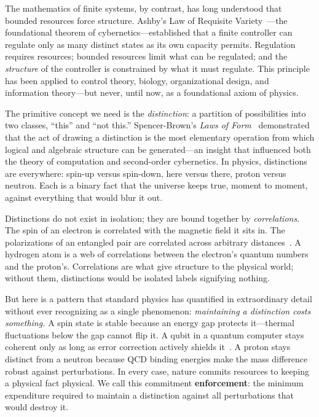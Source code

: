 \documentclass[11pt]{article}
\begin{document}
The mathematics of finite systems, by contrast, has long understood that bounded resources force structure.  Ashby's Law of Requisite Variety~\cite{Ashby1956}---the foundational theorem of cybernetics---established that a finite controller can regulate only as many distinct states as its own capacity permits.  Regulation requires resources; bounded resources limit what can be regulated; and the \emph{structure} of the controller is constrained by what it must regulate.  This principle has been applied to control theory, biology, organizational design, and information theory---but never, until now, as a foundational axiom of physics.

The primitive concept we need is the \emph{distinction}: a partition of possibilities into two classes, ``this'' and ``not this.''  Spencer-Brown's \emph{Laws of Form}~\cite{SpencerBrown1969} demonstrated that the act of drawing a distinction is the most elementary operation from which logical and algebraic structure can be generated---an insight that influenced both the theory of computation and second-order cybernetics.  In physics, distinctions are everywhere: spin-up versus spin-down, here versus there, proton versus neutron.  Each is a binary fact that the universe keeps true, moment to moment, against everything that would blur it out.

Distinctions do not exist in isolation; they are bound together by \emph{correlations}.  The spin of an electron is correlated with the magnetic field it sits in.  The polarizations of an entangled pair are correlated across arbitrary distances~\cite{Bell1964}.  A hydrogen atom is a web of correlations between the electron's quantum numbers and the proton's.  Correlations are what give structure to the physical world; without them, distinctions would be isolated labels signifying nothing.

But here is a pattern that standard physics has quantified in extraordinary detail without ever recognizing as a single phenomenon: \emph{maintaining a distinction costs something.}  A spin state is stable because an energy gap protects it---thermal fluctuations below the gap cannot flip it.  A qubit in a quantum computer stays coherent only as long as error correction actively shields it~\cite{NielsenChuang2000}.  A proton stays distinct from a neutron because QCD binding energies make the mass difference robust against perturbations.  In every case, nature commits resources to keeping a physical fact physical.  We call this commitment \textbf{enforcement}: the minimum expenditure required to maintain a distinction against all perturbations that would destroy it.
\end{document}
